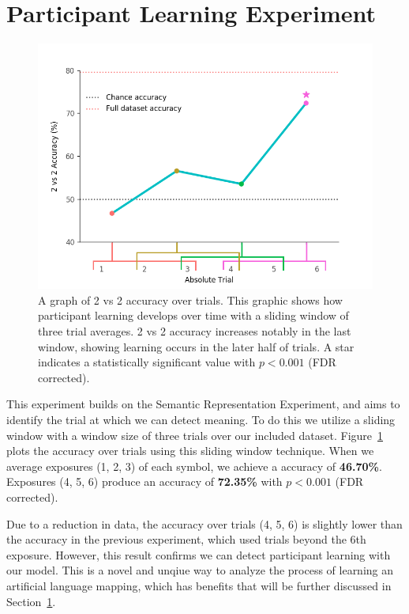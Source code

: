 \section{Participant Learning Experiment}
\label{sec:results:participantlearning}

\begin{figure}[t]
  \centering
  \includegraphics[width=0.75\linewidth]{figures/learning}
  \caption[\tvt Accuracy over Trials]{
    A graph of 2 vs 2 accuracy over trials. This graphic shows how participant 
    learning develops over time with a sliding window of three trial averages.  
    2 vs 2 accuracy increases notably in the last window, showing learning 
    occurs in the later half of trials. A star indicates a statistically 
    significant value with $p < 0.001$ (FDR corrected).
  }
  \label{fig:learning}
\end{figure}

This experiment builds on the Semantic Representation Experiment, and aims to 
identify the trial at which we can detect meaning. To do this we utilize a 
sliding window with a window size of three trials over our included dataset.   
Figure~\ref{fig:learning} plots the \tvt accuracy over trials using this 
sliding window technique. When we average exposures (1, 2, 3) of each symbol, 
we achieve a \tvt accuracy of \textbf{46.70\%}. Exposures (4, 5, 6) produce an 
accuracy of \textbf{72.35\%} with $p < 0.001$ (FDR corrected). 

Due to a reduction in data, the \tvt accuracy over trials (4, 5, 6) is slightly 
lower than the \tvt accuracy in the previous experiment, which used trials 
beyond the 6th exposure. However, this result confirms we can detect 
participant learning with our model. This is a novel and unqiue way to analyze 
the process of learning an artificial language mapping, which has benefits that 
will be further discussed in Section~\ref{sec:results:participantlearning}.
